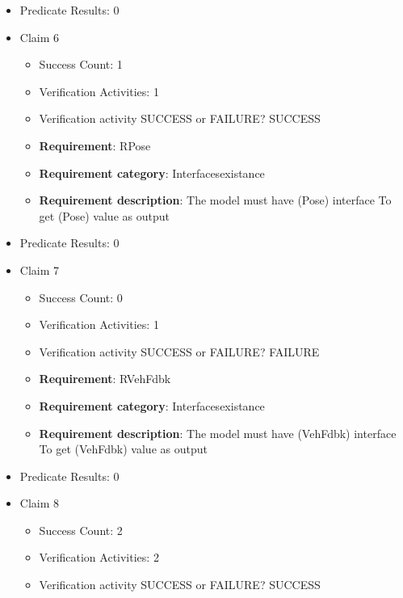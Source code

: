 \documentclass{article}
\begin{document}
\begin{itemize}
									    
				\item Predicate Results: 0

  				  \item Claim 6
				\begin{itemize}
			    	\item Success Count: 1 
			    	\item Verification Activities: 1
					\item Verification activity SUCCESS or FAILURE? SUCCESS
		
						\item \textbf{Requirement}: RPose 
						\item \textbf{Requirement category}: Interfacesexistance 
						\item \textbf{Requirement description}: The model must have (Pose) interface To get (Pose) value as output
					
				\end{itemize}
				
									    
				\item Predicate Results: 0

  				  \item Claim 7
				\begin{itemize}
			    	\item Success Count: 0 
			    	\item Verification Activities: 1
					\item Verification activity SUCCESS or FAILURE? FAILURE
		
						\item \textbf{Requirement}: RVehFdbk 
						\item \textbf{Requirement category}: Interfacesexistance 
						\item \textbf{Requirement description}: The model must have (VehFdbk) interface To get (VehFdbk) value as output
					
				\end{itemize}
				
									    
				\item Predicate Results: 0

  				  \item Claim 8
				\begin{itemize}
			    	\item Success Count: 2 
			    	\item Verification Activities: 2
					\item Verification activity SUCCESS or FAILURE? SUCCESS
		

\end{itemize}
\end{itemize}
\end{document}

